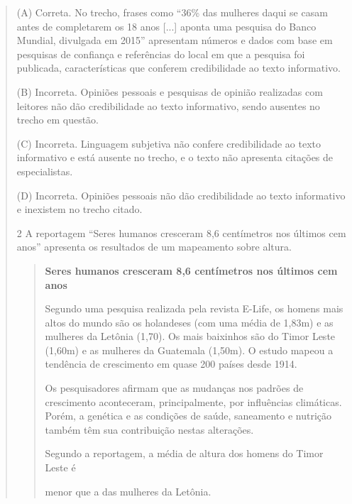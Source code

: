 \begin{escolha}
\begin{quote}

(A) Correta. No trecho, frases como ``36\% das mulheres daqui se casam
antes de completarem os 18 anos {[}...{]} aponta uma pesquisa do Banco
Mundial, divulgada em 2015'' apresentam números e dados com base em
pesquisas de confiança e referências do local em que a pesquisa foi
publicada, características que conferem credibilidade ao texto
informativo.

(B) Incorreta. Opiniões pessoais e pesquisas de opinião realizadas com
leitores não dão credibilidade ao texto informativo, sendo ausentes no
trecho em questão.

(C) Incorreta. Linguagem subjetiva não confere credibilidade ao texto
informativo e está ausente no trecho, e o texto não apresenta citações
de especialistas.

(D) Incorreta. Opiniões pessoais não dão credibilidade ao texto
informativo e inexistem no trecho citado.

\num{2} A reportagem ``Seres humanos cresceram 8,6 centímetros nos últimos cem
anos'' apresenta os resultados de um mapeamento sobre altura.

\begin{quote}
\textbf{Seres humanos cresceram 8,6 centímetros nos últimos cem anos}

Segundo uma pesquisa realizada pela revista E-Life, os homens mais altos
do mundo são os holandeses (com uma média de 1,83m) e as mulheres da
Letônia (1,70). Os mais baixinhos são do Timor Leste (1,60m) e as
mulheres da Guatemala (1,50m). O estudo mapeou a tendência de
crescimento em quase 200 países desde 1914.

Os pesquisadores afirmam que as mudanças nos padrões de crescimento
aconteceram,
principalmente, por influências climáticas. Porém, a genética e as
condições de saúde,
saneamento e nutrição também têm sua contribuição nestas alterações.


Segundo a reportagem, a média de altura dos homens do Timor Leste é

\begin{escolha}
\item menor que a das mulheres da Letônia.


\end{escolha}
\end{quote}
\end{quote}
\end{escolha}
